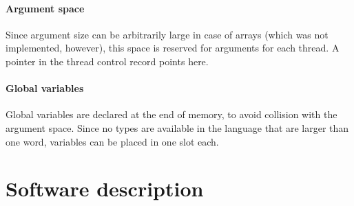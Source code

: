 \documentclass[10pt,a4paper]{report}
\begin{document}
\subsubsection{Argument space}
Since argument size can be arbitrarily large in case of arrays (which was not implemented, however), this space is reserved for arguments for each thread. A pointer in the thread control record points here.
       
\subsubsection{Global variables}
Global variables are declared at the end of memory, to avoid collision with the argument space. Since no types are available in the language that are larger than one word, variables can be placed in one slot each.


\chapter{Software description}
\end{document}
